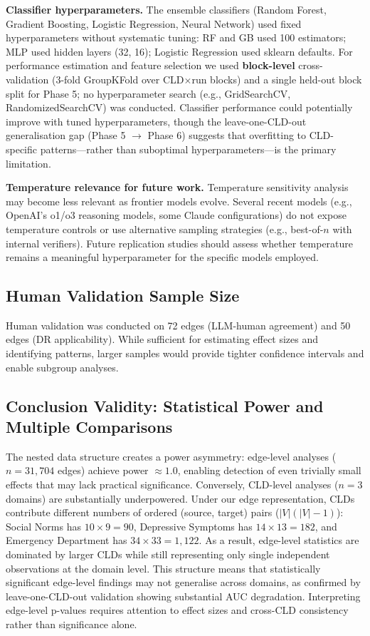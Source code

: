 \textbf{Classifier hyperparameters.} The ensemble classifiers (Random Forest, Gradient Boosting, Logistic Regression, Neural Network) used fixed hyperparameters without systematic tuning: RF and GB used 100 estimators; MLP used hidden layers (32, 16); Logistic Regression used sklearn defaults. For performance estimation and feature selection we used \textbf{block-level} cross-validation (3-fold GroupKFold over CLD$\times$run blocks) and a single held-out block split for Phase 5; no hyperparameter search (e.g., GridSearchCV, RandomizedSearchCV) was conducted. Classifier performance could potentially improve with tuned hyperparameters, though the leave-one-CLD-out generalisation gap (Phase 5 $\rightarrow$ Phase 6) suggests that overfitting to CLD-specific patterns---rather than suboptimal hyperparameters---is the primary limitation.

\textbf{Temperature relevance for future work.} Temperature sensitivity analysis may become less relevant as frontier models evolve. Several recent models (e.g., OpenAI's o1/o3 reasoning models, some Claude configurations) do not expose temperature controls or use alternative sampling strategies (e.g., best-of-$n$ with internal verifiers). Future replication studies should assess whether temperature remains a meaningful hyperparameter for the specific models employed.

\subsection{Human Validation Sample Size}

Human validation was conducted on 72 edges (LLM-human agreement) and 50 edges (DR applicability). While sufficient for estimating effect sizes and identifying patterns, larger samples would provide tighter confidence intervals and enable subgroup analyses.

\subsection{Conclusion Validity: Statistical Power and Multiple Comparisons}

The nested data structure creates a power asymmetry: edge-level analyses ($n = 31{,}704$ edges) achieve power $\approx 1.0$, enabling detection of even trivially small effects that may lack practical significance. Conversely, CLD-level analyses ($n = 3$ domains) are substantially underpowered. Under our edge representation, CLDs contribute different numbers of ordered (source, target) pairs ($|V|(|V|-1)$): Social Norms has $10\times 9=90$, Depressive Symptoms has $14\times 13=182$, and Emergency Department has $34\times 33=1{,}122$. As a result, edge-level statistics are dominated by larger CLDs while still representing only single independent observations at the domain level. This structure means that statistically significant edge-level findings may not generalise across domains, as confirmed by leave-one-CLD-out validation showing substantial AUC degradation. Interpreting edge-level p-values requires attention to effect sizes and cross-CLD consistency rather than significance alone.

